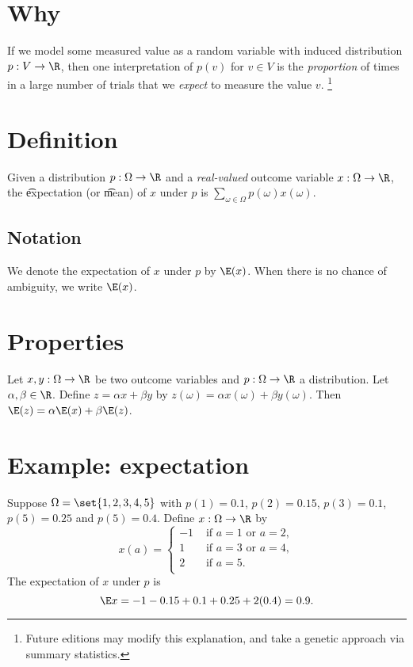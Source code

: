 
\section*{Why}

If we model some measured value as a random variable with induced distribution $p: V \to \R $, then one interpretation of $p(v)$ for $v \in V$ is the \textit{proportion} of times in a large number of trials that we \textit{expect} to measure the value $v$.
  \ifhmode\unskip\fi\footnote{
Future editions may modify this explanation, and take a genetic approach via summary statistics.
  }

\section*{Definition}

Given a distribution $p: \Omega  \to \R $ and a \textit{real-valued} outcome variable $x: \Omega  \to \R $, the \t{expectation} (or \t{mean}) of $x$ under $p$ is $\sum_{\omega \in \Omega } p(\omega )x(\omega )$.

\subsection*{Notation}

We denote the expectation of $x$ under $p$ by $\E (x)$.
When there is no chance of ambiguity, we write $\E (x)$.

\section*{Properties}

Let $x, y : \Omega  \to \R $ be two outcome variables and $p: \Omega  \to \R $ a distribution.
Let $\alpha , \beta  \in \R $.
Define $z = \alpha x + \beta y$ by $z(\omega ) = \alpha x(\omega ) + \beta y(\omega )$.
Then $\E (z) = \alpha \E (x) + \beta \E (z)$.

\section*{Example: expectation}

Suppose $\Omega  = \set{1, 2, 3, 4, 5}$ with $p(1) = 0.1$, $p(2) = 0.15$, $p(3) = 0.1$, $p(5) = 0.25$ and $p(5) = 0.4$.
Define $x: \Omega  \to \R $ by
  \[
x(a) = \begin{cases}
-1 & \text{ if } a = 1 \text{ or } a = 2, \\
1 & \text{ if } a = 3 \text{ or } a = 4, \\
2 & \text{ if } a = 5. \\
\end{cases}
  \]
The expectation of $x$ under $p$ is
  \[
\E x = -1 -0.15 + 0.1 + 0.25 + 2(0.4) = 0.9.
  \]

